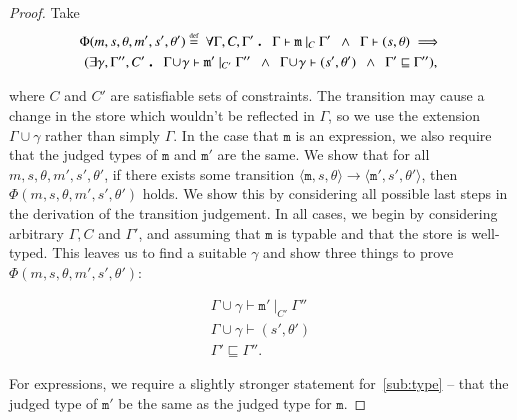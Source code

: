 \documentclass[12pt,a4paper,twoside,openright]{report}
\theoremstyle{definition}
\theoremstyle{dotless}
\newcommand{\transition}[6]{\langle{}\mathtt{#1},#2,#3\rangle{}\rightarrow{}\langle{}\mathtt{#4},#5,#6\rangle}
\newcommand\eqdef{\mathrel{\overset{\makebox[0pt]{\mbox{\normalfont\tiny def}}}{=}}}
\newcommand\qdot{\mathbin{\scalebox{1.5}{.}}\enspace}
\begin{document}
\begin{proof}
  Take 
  \begin{multline*}
 	\Phi(m, s, \theta, m', s', \theta') \eqdef 
	\	\forall\Gamma,C,\Gamma' \qdot
	\Gamma\vdash\mathtt{m}\ |_C\ \Gamma' 
	\enspace\land\enspace\Gamma\vdash (s,\theta)
	\implies \\
   	(\exists\gamma,\Gamma'',C'\qdot
    \Gamma\!\cup\!\gamma\vdash \mathtt{m'}\ |_{C'}\ \Gamma'' 
	\enspace\land\enspace\Gamma\!\cup\!\gamma\vdash (s',\theta')
	\enspace\land\enspace \Gamma'\sqsubseteq\Gamma''),
  \end{multline*} 

  where $C$ and $C'$ are satisfiable sets of constraints. The transition may
  cause a change in the store which wouldn't be reflected in $\Gamma$, so we
  use the extension $\Gamma\!\cup\!\gamma$ rather than simply $\Gamma$. In the
  case that $\mathtt{m}$ is an expression, we also require that the judged
  types of $\mathtt{m}$ and $\mathtt{m'}$ are the same. We show that for all
  $m, s, \theta, m', s', \theta'$, if there exists some transition
  $\transition{m}{s}{\theta}{m'}{s'}{\theta'}$, then
  $\Phi(m,s,\theta,m',s',\theta')$ holds. We show this by considering all
  possible last steps in the derivation of the transition judgement. In all
  cases, we begin by considering arbitrary $\Gamma, C$ and $\Gamma'$, and
  assuming that $\mathtt{m}$ is typable and that the store is well-typed. This leaves us to find
  a suitable $\gamma$ and show three things to prove $\Phi(m,s,\theta,m',s',\theta')$:

  \begin{gather}
	\Gamma\!\cup\!\gamma\vdash\mathtt{m'}\ |_{C'}\ \Gamma'' \label{sub:type}\\
	\Gamma\!\cup\!\gamma\vdash(s',\theta') \label{sub:store} \\
	\Gamma' \sqsubseteq \Gamma'' \label{sub:env}.
  \end{gather}

  For expressions, we require a slightly stronger statement for~\eqref{sub:type} -- that
  the judged type of $\mathtt{m'}$ be the same as the judged type for $\mathtt{m}$.


\end{proof}
\end{document}
